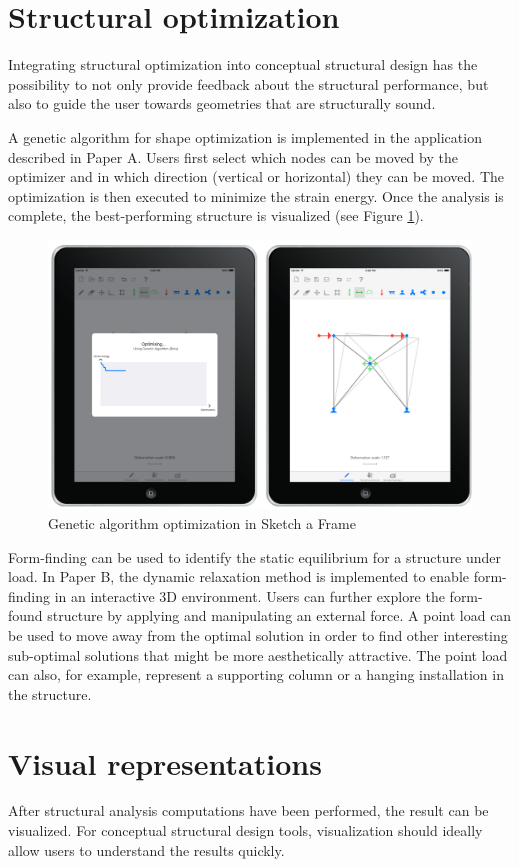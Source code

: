 \section{Structural optimization}
Integrating structural optimization into conceptual structural design has the possibility to not only provide feedback about the structural performance, but also to guide the user towards geometries that are structurally sound. 

A genetic algorithm for shape optimization is implemented in the application described in Paper A. Users first select which nodes can be moved by the optimizer and in which direction (vertical or horizontal) they can be moved. The optimization is then executed to minimize the strain energy. Once the analysis is complete, the best-performing structure is visualized (see Figure \ref{fig:ipad-ga}). 

\begin{figure}
  \includegraphics[width=330pt]{graphics/ipad-ga.png}
  \caption{Genetic algorithm optimization in Sketch a Frame}
  \label{fig:ipad-ga}
\end{figure}

Form-finding can be used to identify the static equilibrium for a structure under load. In Paper B, the dynamic relaxation method is implemented to enable form-finding in an interactive 3D environment. Users can further explore the form-found structure by applying and manipulating an external force. A point load can be used to move away from the optimal solution in order to find other interesting sub-optimal solutions that might be more aesthetically attractive. The point load can also, for example, represent a supporting column or a hanging installation in the structure.


\section{Visual representations}
After structural analysis computations have been performed, the result can be visualized. For conceptual structural design tools, visualization should ideally allow users to understand the results quickly. 

